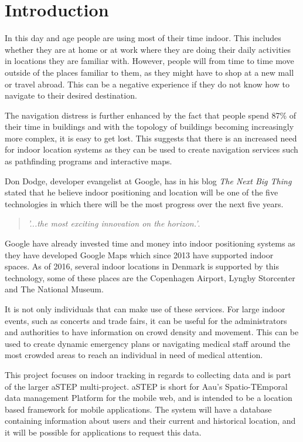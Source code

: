 \chapter{Introduction}
In this day and age people are using most of their time indoor. This includes whether they are at home or at work where they are doing their daily activities in locations they are familiar with. However, people will from time to time move outside of the places familiar to them, as they might have to shop at a new mall or travel abroad. This can be a negative experience if they do not know how to navigate to their desired destination.

The navigation distress is further enhanced by the fact that people spend 87\% of their time in buildings\cite{klepeis2001national} and with the topology of buildings becoming increasingly more complex, it is easy to get lost. This suggests that there is an increased need for indoor location systems as they can be used to create navigation services such as pathfinding programs and interactive maps. %

Don Dodge, developer evangelist at Google, has in his blog \textit{The Next Big Thing} stated that he believe indoor positioning and location will be one of the five technologies in which there will be the most progress over the next five years\cite{DonDIndoorIsNext}.
\begin{quotation}
	\textit{'...the most exciting innovation on the horizon.'}\cite{DonDNextBigThing}.
\end{quotation}
Google have already invested time and money into indoor positioning systems as they have developed Google Maps which since 2013 have supported indoor spaces\cite{google_indoor}. As of 2016, several indoor locations in Denmark is supported by this technology, some of these places are the Copenhagen Airport, Lyngby Storcenter and The National Museum\cite{google_dk}.

It is not only individuals that can make use of these services. For large indoor events, such as concerts and trade fairs, it can be useful for the administrators and authorities to have information on crowd density and movement. This can be used to create dynamic emergency plans or navigating medical staff around the most crowded areas to reach an individual in need of medical attention.

This project focuses on indoor tracking in regards to collecting data and is part of the larger aSTEP multi-project. aSTEP is short for Aau's Spatio-TEmporal data management Platform for the mobile web, and is intended to be a location based framework for mobile applications. The system will have a database containing information about users and their current and historical location, and it will be possible for applications to request this data.

